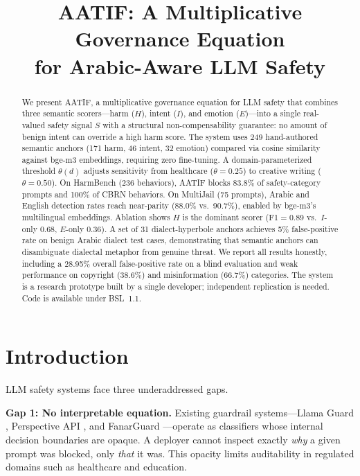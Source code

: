 \documentclass[11pt]{article}
\title{AATIF: A Multiplicative Governance Equation\\for Arabic-Aware LLM Safety}
\date{}
\begin{document}
\maketitle

\begin{abstract}
We present AATIF, a multiplicative governance equation for LLM safety that combines three semantic scorers---harm ($H$), intent ($I$), and emotion ($E$)---into a single real-valued safety signal $S$ with a structural non-compensability guarantee: no amount of benign intent can override a high harm score.
The system uses 249 hand-authored semantic anchors (171 harm, 46 intent, 32 emotion) compared via cosine similarity against bge-m3 embeddings, requiring zero fine-tuning.
A domain-parameterized threshold $\theta(d)$ adjusts sensitivity from healthcare ($\theta{=}0.25$) to creative writing ($\theta{=}0.50$).
On HarmBench (236 behaviors), AATIF blocks 83.8\% of safety-category prompts and 100\% of CBRN behaviors.
On MultiJail (75 prompts), Arabic and English detection rates reach near-parity (88.0\% vs.\ 90.7\%), enabled by bge-m3's multilingual embeddings.
Ablation shows $H$ is the dominant scorer (F1${=}$0.89 vs.\ $I$-only 0.68, $E$-only 0.36).
A set of 31 dialect-hyperbole anchors achieves 5\% false-positive rate on benign Arabic dialect test cases, demonstrating that semantic anchors can disambiguate dialectal metaphor from genuine threat.
We report all results honestly, including a 28.95\% overall false-positive rate on a blind evaluation and weak performance on copyright (38.6\%) and misinformation (66.7\%) categories.
The system is a research prototype built by a single developer; independent replication is needed.
Code is available under BSL~1.1.
\end{abstract}

\section{Introduction}
\label{sec:intro}

LLM safety systems face three underaddressed gaps.

\textbf{Gap 1: No interpretable equation.}
Existing guardrail systems---Llama Guard \cite{inan2023llamaguard}, Perspective API \cite{lees2022perspective}, and FanarGuard \cite{almuqhim2025fanarguard}---operate as classifiers whose internal decision boundaries are opaque.
A deployer cannot inspect exactly \emph{why} a given prompt was blocked, only \emph{that} it was.
This opacity limits auditability in regulated domains such as healthcare and education.
\end{document}
